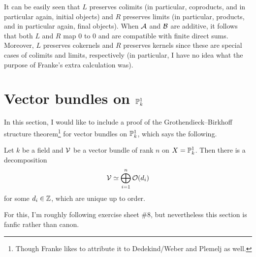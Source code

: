 \documentclass[a4paper,parskip=half,numbers=enddot, DIV=12]{scrreprt}
\begin{document}
\begin{rem}
	It can be easily seen that $L$ preserves colimits (in particular, coproducts, and in particular again, initial objects) and $R$ preserves limits (in particular, products, and in particular again, final objects). When $\mathcal{A}$ and $\mathcal{B}$ are additive, it follows that both $L$ and $R$ map $0$ to $0$ and are compatible with finite direct sums. Moreover, $L$ preserves cokernels and $R$ preserves kernels since these are special cases of colimits and limits, respectively (in particular, I have no idea what the purpose of Franke's extra calculation was).%
\end{rem}
\section{Vector bundles on \texorpdfstring{$\mathbb{P}_k^1$}{P}}
In this section, I would like to include a proof of the Grothendieck--Birkhoff structure theorem\footnote{Though Franke likes to attribute it to Dedekind/Weber and Plemelj as well.} for vector bundles on $\mathbb{P}_k^1$, which says the following.
\begin{thm}
	Let $k$ be a field and $\mathcal{V}$ be a vector bundle of rank $n$ on $X=\mathbb{P}_k^1$. Then there is a decomposition
	\begin{align*}
		\mathcal{V}\simeq\bigoplus_{i=1}^n\mathcal{O}(d_i)
	\end{align*}
	for some $d_i\in \mathbb{Z}$, which are unique up to order.
\end{thm}
For this, I'm roughly following exercise sheet \#8, but nevertheless this section is fanfic rather than canon.
\end{document}
